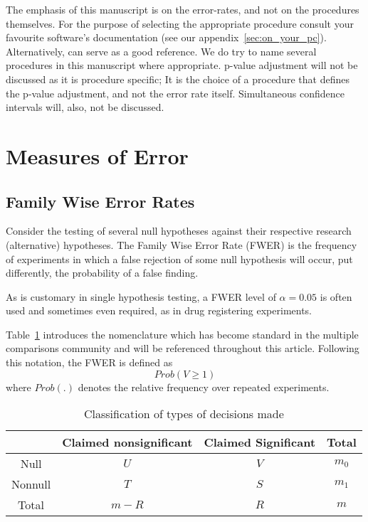 \documentclass[review,12pt]{article}
\begin{document}
The emphasis of this manuscript is on the error-rates, and not on the procedures themselves. For the purpose of selecting the appropriate procedure consult your favourite software's documentation (see our appendix~\ref{sec:on_your_pc}). Alternatively, \citet{farcomeni_review_2008} can serve as a good reference. 
We do try to name several procedures in this manuscript where appropriate.  p-value adjustment will not be discussed as it is procedure specific; It is the choice of a procedure that defines the p-value adjustment, and not the error rate itself.
Simultaneous confidence intervals will, also, not be discussed.  


\section{\label{sec:measures_of_error}Measures of Error}

\subsection{Family Wise Error Rates}
Consider the testing of several null hypotheses against their respective research (alternative) hypotheses. The Family Wise Error Rate (FWER) is the frequency of experiments in which a false rejection of some null hypothesis will occur, put differently, the probability of a false finding.

As is customary in single hypothesis testing, a FWER level of $\alpha=0.05$ is often used and sometimes even required, as in drug registering experiments.




Table~\ref{tab:event_notation} introduces the nomenclature which has become standard in the multiple comparisons community and will be referenced throughout this article. Following this notation, the FWER is defined as $$Prob(V \geq 1 )$$ where $Prob(.)$ denotes the relative frequency over repeated experiments.



\begin{table}[h]
  \centering
\begin{tabular}{|c|c|c|c|}
\hline \rule[-1ex]{0pt}{1.5ex} & Claimed nonsignificant & Claimed Significant & Total \\ 
\hline
\hline \rule[-1ex]{0pt}{1.5ex} Null & $U$ & $V$ & $m_0$ \\ 
\hline \rule[-1ex]{0pt}{1.5ex} Nonnull & $T$ & $S$ & $m_1$ \\ 
\hline \rule[-1ex]{0pt}{1.5ex} Total & $m-R$ & $R$ & $m$ \\ 
\hline 
\end{tabular} 
  \caption{Classification of types of decisions made}
  \label{tab:event_notation}
\end{table}
\end{document}
